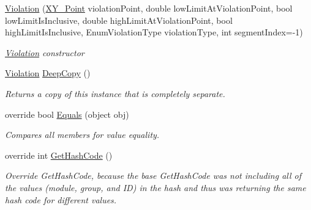 \begin{DoxyCompactItemize}
\item 
\mbox{\hyperlink{class_c_s_i_1_1_library_1_1_array_utilities_1_1_array_limit_checks_1_1_violation_a8c51ba0cfcbfc757b698ea7681c164e6}{Violation}} (\mbox{\hyperlink{struct_c_s_i_1_1_library_1_1_data_types_1_1_x_y___point}{X\+Y\+\_\+\+Point}} violation\+Point, double low\+Limit\+At\+Violation\+Point, bool low\+Limit\+Is\+Inclusive, double high\+Limit\+At\+Violation\+Point, bool high\+Limit\+Is\+Inclusive, Enum\+Violation\+Type violation\+Type, int segment\+Index=-\/1)
\begin{DoxyCompactList}\small\item\em \mbox{\hyperlink{class_c_s_i_1_1_library_1_1_array_utilities_1_1_array_limit_checks_1_1_violation}{Violation}} constructor \end{DoxyCompactList}\item 
\mbox{\hyperlink{class_c_s_i_1_1_library_1_1_array_utilities_1_1_array_limit_checks_1_1_violation}{Violation}} \mbox{\hyperlink{class_c_s_i_1_1_library_1_1_array_utilities_1_1_array_limit_checks_1_1_violation_ac05d3e5edc82aed8e5c4da8e5caf9897}{Deep\+Copy}} ()
\begin{DoxyCompactList}\small\item\em Returns a copy of this instance that is completely separate. \end{DoxyCompactList}\item 
override bool \mbox{\hyperlink{class_c_s_i_1_1_library_1_1_array_utilities_1_1_array_limit_checks_1_1_violation_a7178a73e1c7fbf93105d7f6a14c52c93}{Equals}} (object obj)
\begin{DoxyCompactList}\small\item\em Compares all members for value equality. \end{DoxyCompactList}\item 
override int \mbox{\hyperlink{class_c_s_i_1_1_library_1_1_array_utilities_1_1_array_limit_checks_1_1_violation_adf744b264509790663aacfefbd73bad8}{Get\+Hash\+Code}} ()
\begin{DoxyCompactList}\small\item\em Override Get\+Hash\+Code, because the base Get\+Hash\+Code was not including all of the values (module, group, and ID) in the hash and thus was returning the same hash code for different values. \end{DoxyCompactList}\end{DoxyCompactItemize}

